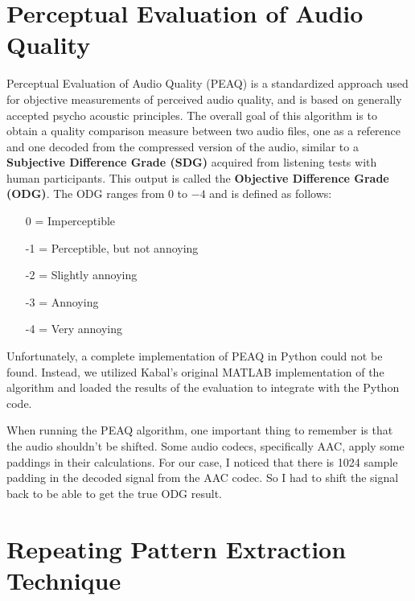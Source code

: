 \section{Perceptual Evaluation of Audio Quality}
\label{sec:peaq}

Perceptual Evaluation of Audio Quality (PEAQ) \cite{peaq} is a standardized approach used for objective measurements of perceived audio quality, and is based on generally accepted psycho acoustic principles. The overall goal of this algorithm is to obtain a quality comparison measure between two audio files, one as a reference and one decoded from the compressed version of the audio, similar to a \textbf{Subjective Difference Grade (SDG)} acquired from listening tests with human participants. This output is called the \textbf{Objective Difference Grade (ODG)}. The ODG ranges from $0$ to $-4$ and is defined as follows:

\begin{enumerate}[noitemsep]
    \item [0] = Imperceptible
    \item [-1] = Perceptible, but not annoying
    \item [-2] = Slightly annoying
    \item [-3] = Annoying
    \item [-4] = Very annoying
\end{enumerate}


Unfortunately, a complete implementation of PEAQ in Python could not be found. Instead, we utilized Kabal's original MATLAB implementation of the algorithm \cite{kabal2002examination} and loaded the results of the evaluation to integrate with the Python code.

When running the PEAQ algorithm, one important thing to remember is that the audio shouldn't be shifted. Some audio codecs, specifically AAC, apply some paddings in their calculations. For our case, I noticed that there is 1024 sample padding in the decoded signal from the AAC codec. So I had to shift the signal back to be able to get the true ODG result.

\section{Repeating Pattern Extraction Technique}
\label{sec:repet}

